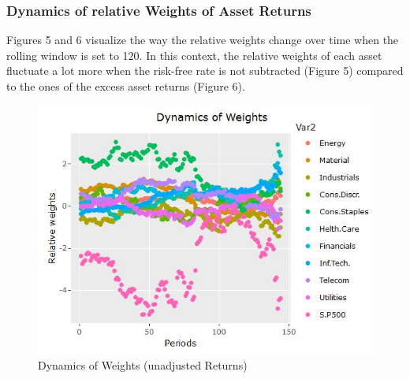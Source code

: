 \documentclass{article}
\begin{document}
\subsubsection{Dynamics of relative Weights of Asset Returns}
Figures 5 and 6 visualize the way the relative weights change over time when the rolling window is set to 120. In this context, the relative weights of each asset fluctuate a lot more when the risk-free rate is not subtracted (Figure 5) compared to the ones of the excess asset returns (Figure 6). 
\begin {figure}[H]
    \begin{center}
    \includegraphics[scale=0.7]{dn_wg_unadj_MV.JPG}
    \caption{Dynamics of Weights (unadjusted Returns)}
    \end{center}
\end{figure}
\end{document}
